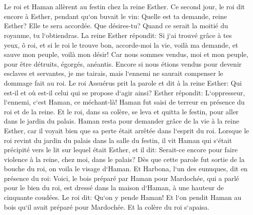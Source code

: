 \chapter{}

\verse Le roi et Haman allèrent au festin chez la reine Esther. 
\verse Ce second jour, le roi dit encore à Esther, pendant qu`on buvait le vin: Quelle est ta demande, reine Esther? Elle te sera accordée. Que désires-tu? Quand ce serait la moitié du royaume, tu l`obtiendras. 
\verse La reine Esther répondit: Si j`ai trouvé grâce à tes yeux, ô roi, et si le roi le trouve bon, accorde-moi la vie, voilà ma demande, et sauve mon peuple, voilà mon désir! 
\verse Car nous sommes vendus, moi et mon peuple, pour être détruits, égorgés, anéantis. Encore si nous étions vendus pour devenir esclaves et servantes, je me tairais, mais l`ennemi ne saurait compenser le dommage fait au roi. 
\verse Le roi Assuérus prit la parole et dit à la reine Esther: Qui est-il et où est-il celui qui se propose d`agir ainsi? 
\verse Esther répondit: L`oppresseur, l`ennemi, c`est Haman, ce méchant-là! Haman fut saisi de terreur en présence du roi et de la reine. 
\verse Et le roi, dans sa colère, se leva et quitta le festin, pour aller dans le jardin du palais. Haman resta pour demander grâce de la vie à la reine Esther, car il voyait bien que sa perte était arrêtée dans l`esprit du roi. 
\verse Lorsque le roi revint du jardin du palais dans la salle du festin, il vit Haman qui s`était précipité vers le lit sur lequel était Esther, et il dit: Serait-ce encore pour faire violence à la reine, chez moi, dans le palais? Dès que cette parole fut sortie de la bouche du roi, on voila le visage d`Haman. 
\verse Et Harbona, l`un des eunuques, dit en présence du roi: Voici, le bois préparé par Haman pour Mardochée, qui a parlé pour le bien du roi, est dressé dans la maison d`Haman, à une hauteur de cinquante coudées. Le roi dit: Qu`on y pende Haman! 
\verse Et l`on pendit Haman au bois qu`il avait préparé pour Mardochée. Et la colère du roi s`apaisa. 

\chapter{}

